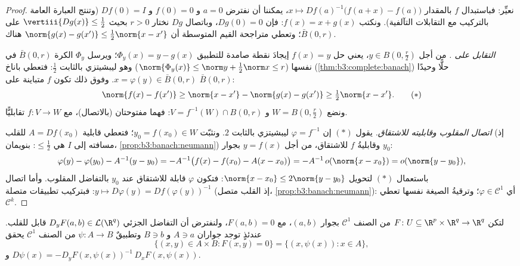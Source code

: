 \begin{proof}
نعيِّر: فباستبدال $f$ بالمقدار $x \mapsto Df(a)^{-1}\bigl(f(a +
x) - f(a)\bigr)$، يمكننا أن نفترض $a = 0$
و $f(0) = 0$ و $Df(0) =
I$ (وتنتج العبارة العامة بالتركيب مع
التقابلات التآلفية). ونكتب $f(x) = x + g(x)$: فإن $Dg(0) = 0$، وباتصال
$Dg$ نختار $r > 0$ بحيث $\vertiii{Dg(x)} \leq \frac12$ على $\bar B(0, r)$؛ وتعطي
متراجحة القيم المتوسطة أن $\norm{g(x) - g(x')} \leq \frac12
\norm{x - x'}$ هناك.

\emph{التقابل على .} من أجل $y \in B(0,
\frac r2)$، يعني حل $f(x) = y$
إيجادَ نقطة صامدة للتطبيق $\Phi_y(x) = y - g(x)$؛ ويرسل $\Phi_y$ الكرة
$\bar B(0, r)$ في نفسها ($\norm{\Phi_y(x)} \leq \norm y + \frac12\norm x \leq
r$) وهو ليبشيتزي بالثابت
$\frac12$: فتعطي باناخ (\cref{thm:b3:complete:banach}) حلًّا وحيدًا $x = \varphi(y) \in \bar B(0,r)$. وفوق
ذلك تكون $f$ متباينة على $\bar B(0,r)$:
\[
\norm{f(x) - f(x')} \geq \norm{x - x'} - \norm{g(x) - g(x')}
\geq \tfrac12\norm{x - x'} .
\tag{$*$}
\]
ونضع $W = B(0, \frac r2)$ و $V = f^{-1}(W)\cap B(0, r)$: فهما مفتوحتان (بالاتصال)، مع $f \colon V \to W$
تقابليًّا.

\emph{اتصال المقلوب وقابليته للاشتقاق.} يقول $(*)$ إن $\varphi = f^{-1}$
ليبشيتزي بالثابت $2$. ونثبّت $y_0 = f(x_0)
\in W$؛ فتعطي قابلية $A = Df(x_0)$
للقلب (إذ مسافته إلى $I$ هي $\leq \frac12$: بنويمان،
\cref{prop:b3:banach:neumann}) وقابليةُ $f$ للاشتقاق، من أجل $y = f(x)$ بجوار
$y_0$:
\[
\varphi(y) - \varphi(y_0) - A^{-1}(y - y_0)
= -A^{-1}\bigl(f(x) - f(x_0) - A(x - x_0)\bigr)
= -A^{-1}\,o(\norm{x - x_0}) = o(\norm{y - y_0}),
\]
باستعمال $(*)$ لتحويل $\norm{x - x_0} \leq 2\norm{y - y_0}$: فتكون $\varphi$ قابلة للاشتقاق
عند $y_0$ بالتفاضل المقلوب. وأما اتصال $y \mapsto D\varphi(y) =
Df(\varphi(y))^{-1}$: فبتركيب تطبيقات
متصلة (إذ القلب متصل، \cref{prop:b3:banach:neumann}): أي $\varphi \in \mathcal C^1$؛ وترقيةُ الصيغة
نفسها تعطي $\mathcal C^k$.
\end{proof}

\begin{theorem}
\label{thm:b3:submanifolds:implicit}
لتكن $F \colon U \subseteq \R^p\times\R^q \to \R^q$ من الصنف $\mathcal C^1$ بجوار $(a, b)$، مع
$F(a,b) = 0$، ولنفترض أن التفاضل الجزئي $D_yF(a,b) \in \mathcal L(\R^q)$ قابل للقلب.
عندئذٍ توجد جواران $A \ni a$ و $B \ni b$ وتطبيقٌ $\psi \colon A \to B$ من
الصنف $\mathcal C^1$ يحقق
\[
\bigl\{(x, y)\in A\times B : F(x,y) = 0\bigr\}
= \{(x, \psi(x)) : x \in A\},
\]
و $D\psi(x) = -D_yF(x, \psi(x))^{-1}\,D_xF(x,
\psi(x))$.
\end{theorem}

